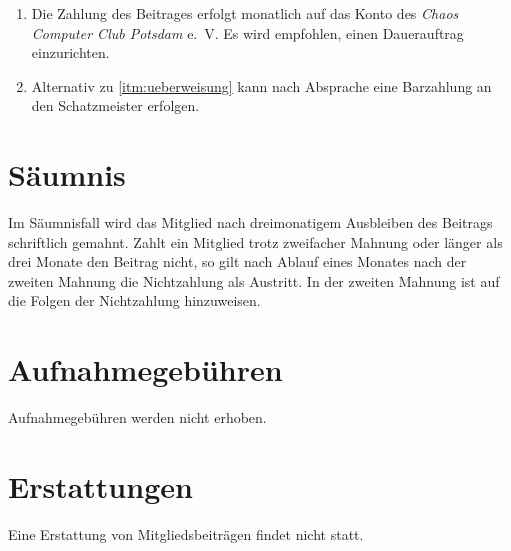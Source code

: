 \documentclass[a4paper, 10pt, headings=normal]{scrartcl}
\begin{document}
\begin{multicols*}{2}
\begin{enumerate}[label={(\arabic*)}]
	\item
		\label{itm:ueberweisung}
		Die Zahlung des Beitrages erfolgt monatlich auf das Konto des \emph{Chaos Computer Club Potsdam} e.~V.
		Es wird empfohlen, einen Dauerauftrag einzurichten.
	\item
		Alternativ zu \ref{itm:ueberweisung} kann nach Absprache eine Barzahlung an den Schatzmeister erfolgen.
\end{enumerate}

\section{Säumnis}

Im Säumnisfall wird das Mitglied nach dreimonatigem Ausbleiben des Beitrags schriftlich gemahnt.
Zahlt ein Mitglied trotz zweifacher Mahnung oder länger als drei Monate den Beitrag nicht, so gilt nach Ablauf eines Monates nach der zweiten Mahnung die Nichtzahlung als Austritt.
In der zweiten Mahnung ist auf die Folgen der Nichtzahlung hinzuweisen.

\section{Aufnahmegebühren}

Aufnahmegebühren werden nicht erhoben.

\section{Erstattungen}

Eine Erstattung von Mitgliedsbeiträgen findet nicht statt.

\end{multicols*}
\end{document}
